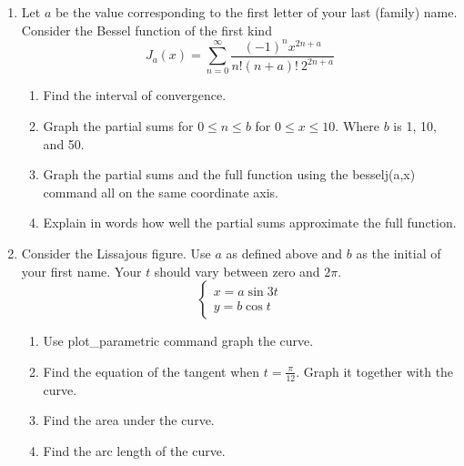 \documentclass[11pt]{article}
\begin{document}
\begin{enumerate}
\item Let $a$ be the value corresponding to the first letter of your last (family) name.  Consider the Bessel function of the first kind
\[
J_a(x)
=
\sum_{n=0}^\infty
\frac{\left(-1\right)^n x^{2n+a}}
{n!\left(n+a\right)!\  2^{2n+a}}
\]
\begin{enumerate}
\item Find the interval of convergence.
\item Graph the partial sums for $0\leq n\leq b$ for $0\leq x\leq10$.  Where $b$ is 1, 10, and 50.
\item Graph the partial sums and the full function using the besselj(a,x) command all on the same coordinate axis.
\item Explain in words how well the partial sums approximate the full function.
\end{enumerate}
\item Consider the Lissajous figure.  Use $a$ as defined above and $b$ as the initial of your first name.  Your $t$ should vary between zero and $2\pi$.
\[
\left\{
\begin{array}{l}
x=a\sin 3t\\
y=b\cos t
\end{array}
\right.
\]
\begin{enumerate}
\item Use plot\_parametric command graph the curve.
\item Find the equation of the tangent when $t=\frac\pi{12}$.  Graph it together with the curve.  
\item Find the area under the curve.
\item Find the arc length of the curve.
\end{enumerate}
\end{enumerate}
\end{document}
